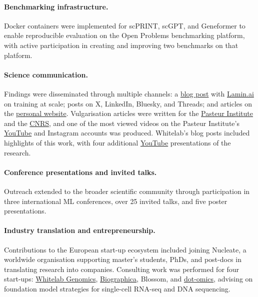 \paragraph{Benchmarking infrastructure.} Docker containers were implemented for \gls{scPRINT},
\gls{scGPT}, and Geneformer to enable reproducible evaluation on the Open Problems benchmarking
platform, with active participation in creating and improving two benchmarks on that platform.

\paragraph{Science communication.} Findings were disseminated through multiple channels: a
\href{https://blog.lamin.ai/arrayloader-benchmarks}{blog post} with
\href{https://lamin.ai}{Lamin.ai} on training at scale; posts on X, LinkedIn, Bluesky, and
Threads; and articles on the \href{https://www.jkobject.com}{personal website}. Vulgarisation
articles were written for the
\href{https://www.pasteur.fr/fr/journal-recherche/videos/langage-cellules}{Pasteur Institute} and
the \href{https://www.insb.cnrs.fr/fr/cnrsinfo/scprint-le-premier-modele-dia-francais-pour-dechiffrer-les-reseaux-genetiques}{\gls{CNRS}},
and one of the most viewed videos on the Pasteur Institute's
\href{https://www.youtube.com/watch?v=bgtcDs5EXY8}{YouTube} and Instagram accounts was produced.
Whitelab's blog posts included highlights of this work, with four additional
\href{https://www.youtube.com/@jkobject}{YouTube} presentations of the research.

\paragraph{Conference presentations and invited talks.} Outreach extended to the broader scientific
community through participation in three international \gls{ML} conferences, over 25 invited talks,
and five poster presentations.

\paragraph{Industry translation and entrepreneurship.} Contributions to the European start-up
ecosystem included joining Nucleate, a worldwide organisation supporting master's students, PhDs,
and post-docs in translating research into companies. Consulting work was performed for four
start-ups: \href{https://whitelabgx.com/}{Whitelab Genomics},
\href{https://graphica.bio/}{Biographica}, Blossom, and
\href{https://www.dotomics.bio/}{dot-omics}, advising on foundation model strategies for
single-cell \gls{RNA-seq} and \gls{DNA} sequencing.
